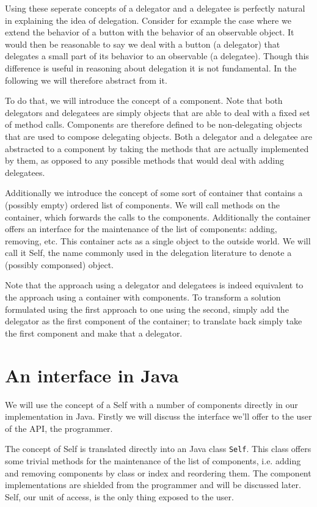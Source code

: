 \documentclass[a4paper,12pt]{book}
\begin{document}
Using these seperate concepts of a delegator and a delegatee is perfectly natural in explaining the idea of delegation. Consider for example the case where we extend the behavior of a button with the behavior of an observable object. It would then be reasonable to say we deal with a button (a delegator) that delegates a small part of its behavior to an observable (a delegatee). Though this difference is useful in reasoning about delegation it is not fundamental. In the following we will therefore abstract from it.

To do that, we will introduce the concept of a component. Note that both delegators and delegatees are simply objects that are able to deal with a fixed set of method calls. Components are therefore defined to be non-delegating objects that are used to compose delegating objects. Both a delegator and a delegatee are abstracted to a component by taking the methods that are actually implemented by them, as opposed to any possible methods that would deal with adding delegatees.

Additionally we introduce the concept of some sort of container that contains a (possibly empty) ordered list of components. We will call methods on the container, which forwards the calls to the components. Additionally the container offers an interface for the maintenance of the list of components: adding, removing, etc. This container acts as a single object to the outside world. We will call it Self, the name commonly used in the delegation literature to denote a (possibly componsed) object.

Note that the approach using a delegator and delegatees is indeed equivalent to the approach using a container with components. To transform a solution formulated using the first approach to one using the second, simply add the delegator as the first component of the container; to translate back simply take the first component and make that a delegator. 

\section*{An interface in Java}
We will use the concept of a Self with a number of components directly in our implementation in Java. Firstly we will discuss the interface we'll offer to the user of the API, the programmer.

The concept of Self is translated directly into an Java class \verb|Self|. This class offers some trivial methods for the maintenance of the list of components, i.e. adding and removing components by class or index and reordering them. The component implementations are shielded from the programmer and will be discussed later. Self, our unit of access, is the only thing exposed to the user.
\end{document}
